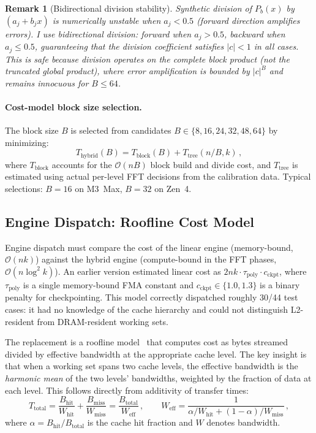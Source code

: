 \documentclass[11pt]{article}
\newtheorem{remark}[theorem]{Remark}
\newcommand{\bigO}{\mathcal{O}}
\begin{document}
\begin{remark}[Bidirectional division stability]
Synthetic division of $P_b(x)$ by $(a_j + b_j x)$ is numerically unstable
when $a_j < 0.5$ (forward direction amplifies errors). I use bidirectional
division: forward when $a_j > 0.5$, backward when $a_j \leq 0.5$,
guaranteeing that the division coefficient satisfies $|c| < 1$ in all cases.
This is safe because division operates on the \emph{complete} block
product (not the truncated global product), where error amplification is
bounded by $|c|^B$ and remains innocuous for $B \leq 64$.
\end{remark}

\paragraph{Cost-model block size selection.}
The block size $B$ is selected from candidates
$B \in \{8, 16, 24, 32, 48, 64\}$ by minimizing:
\begin{equation}\label{eq:hybrid-cost}
  T_{\text{hybrid}}(B) = T_{\text{block}}(B) + T_{\text{tree}}(n/B, k)\,,
\end{equation}
where $T_{\text{block}}$ accounts for the $\bigO(nB)$ block build and
divide cost, and $T_{\text{tree}}$ is estimated using actual per-level
FFT decisions from the calibration data. Typical selections: $B = 16$ on
M3~Max, $B = 32$ on Zen~4.

\subsection{Engine Dispatch: Roofline Cost Model}\label{sec:dispatch}

Engine dispatch must compare the cost of the linear engine (memory-bound,
$\bigO(nk)$) against the hybrid engine (compute-bound in the FFT phases,
$\bigO(n \log^2 k)$). An earlier version estimated linear cost as
$2nk \cdot \tau_{\text{poly}} \cdot c_{\text{ckpt}}$, where
$\tau_{\text{poly}}$ is a single memory-bound FMA constant and
$c_{\text{ckpt}} \in \{1.0, 1.3\}$ is a binary penalty for checkpointing.
This model correctly dispatched roughly 30/44 test cases: it had no
knowledge of the cache hierarchy and could not distinguish L2-resident
from DRAM-resident working sets.

The replacement is a roofline model~\citep{williams2009} that computes
cost as bytes streamed divided by effective bandwidth at the appropriate
cache level. The key insight is that when a working set spans two cache
levels, the effective bandwidth is the \emph{harmonic mean} of the two
levels' bandwidths, weighted by the fraction of data at each level.
This follows directly from additivity of transfer times:
\begin{equation}\label{eq:harmonic-bw}
  T_{\text{total}} = \frac{B_{\text{hit}}}{W_{\text{hit}}}
    + \frac{B_{\text{miss}}}{W_{\text{miss}}}
  = \frac{B_{\text{total}}}{W_{\text{eff}}}\,,
  \qquad
  W_{\text{eff}} = \frac{1}{\alpha / W_{\text{hit}}
    + (1-\alpha) / W_{\text{miss}}}\,,
\end{equation}
where $\alpha = B_{\text{hit}} / B_{\text{total}}$ is the cache hit
fraction and $W$ denotes bandwidth.
\end{document}

